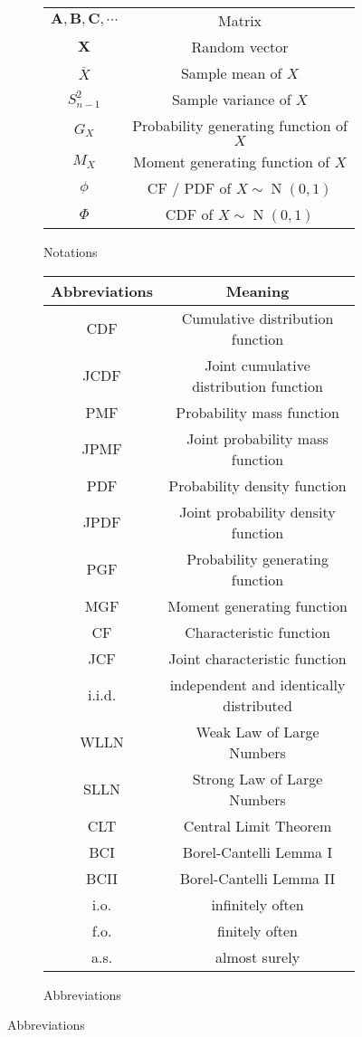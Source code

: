 \documentclass{huhtakm-template-book}
\DeclareMathOperator{\N}{N}
\begin{document}
\begin{figure}[h]
\begin{subfigure}{0.45\textwidth}
\begin{tabular}{cc}
			$\mathbf{A},\mathbf{B},\mathbf{C},\cdots$ & Matrix\\
			$\mathbf{X}$ & Random vector\\
			$\overline{X}$ & Sample mean of $X$\\
			$S_{n-1}^{2}$ & Sample variance of $X$\\
			$G_{X}$ & Probability generating function of $X$\\
			$M_{X}$ & Moment generating function of $X$\\
			$\phi$ & CF / PDF of $X\sim\N(0,1)$\\
			$\Phi$ & CDF of $X\sim\N(0,1)$
		\end{tabular}
		\caption{Notations}
	\end{subfigure}
	\begin{subfigure}{0.45\textwidth}
		\centering
		\begin{tabular}{cc}
			Abbreviations & Meaning\\
			\hline
			CDF & Cumulative distribution function\\
			JCDF & Joint cumulative distribution function\\
			PMF & Probability mass function\\
			JPMF & Joint probability mass function\\
			PDF & Probability density function\\
			JPDF & Joint probability density function\\
			PGF & Probability generating function\\
			MGF & Moment generating function\\
			CF & Characteristic function\\
			JCF & Joint characteristic function\\
			i.i.d. & independent and identically distributed\\
			WLLN & Weak Law of Large Numbers\\
			SLLN & Strong Law of Large Numbers\\
			CLT & Central Limit Theorem\\
			BCI & Borel-Cantelli Lemma I\\
			BCII & Borel-Cantelli Lemma II\\
			i.o. & infinitely often\\
			f.o. & finitely often\\
			a.s. & almost surely
		\end{tabular}
		\caption{Abbreviations}
	\end{subfigure}
\end{figure}
\end{document}
